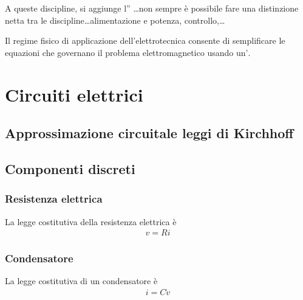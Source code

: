 \documentclass[letterpaper,10pt,italian]{jupyterBook}
\begin{document}
\sphinxAtStartPar
A queste discipline, si aggiunge l” …non sempre è possibile fare una distinzione netta tra le discipline…alimentazione e potenza, controllo,…

\sphinxAtStartPar
Il regime fisico di applicazione dell’elettrotecnica consente di semplificare le equazioni che governano il problema elettromagnetico usando un\(\text{'}\).

\sphinxstepscope


\section{Circuiti elettrici}
\label{\detokenize{ch/electromagnetism/circuits-electric:circuiti-elettrici}}\label{\detokenize{ch/electromagnetism/circuits-electric:physics-hs-electromagnetism-circuits-electric}}\label{\detokenize{ch/electromagnetism/circuits-electric::doc}}

\subsection{Approssimazione circuitale \sphinxhyphen{} leggi di Kirchhoff}
\label{\detokenize{ch/electromagnetism/circuits-electric:approssimazione-circuitale-leggi-di-kirchhoff}}

\subsection{Componenti discreti}
\label{\detokenize{ch/electromagnetism/circuits-electric:componenti-discreti}}

\subsubsection{Resistenza elettrica}
\label{\detokenize{ch/electromagnetism/circuits-electric:resistenza-elettrica}}
\sphinxAtStartPar
La legge costitutiva della resistenza elettrica è
\begin{equation*}
\begin{split}v = R i\end{split}
\end{equation*}

\subsubsection{Condensatore}
\label{\detokenize{ch/electromagnetism/circuits-electric:condensatore}}
\sphinxAtStartPar
La legge costitutiva di un condensatore è
\begin{equation*}
\begin{split}i = C \dot{v}\end{split}
\end{equation*}
\end{document}
